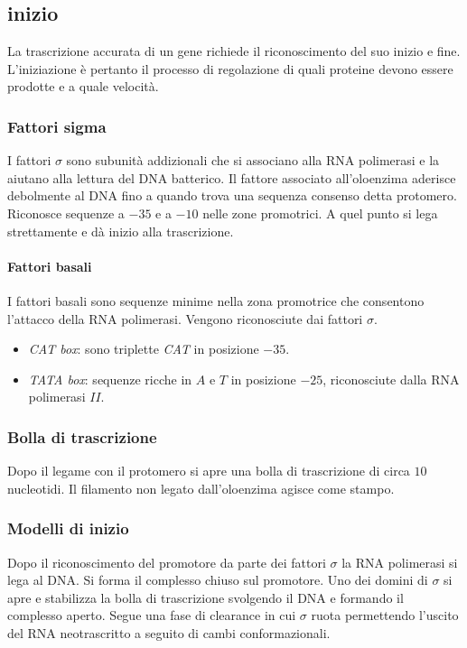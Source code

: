 	\subsection{inizio}
	La trascrizione accurata di un gene richiede il riconoscimento del suo inizio e fine.
	L'iniziazione \`e pertanto il processo di regolazione di quali proteine devono essere prodotte e a quale velocit\`a.

		\subsubsection{Fattori sigma}
		I fattori $\sigma$ sono subunit\`a addizionali che si associano alla RNA polimerasi e la aiutano alla lettura del DNA batterico.
		Il fattore associato all'oloenzima aderisce debolmente al DNA fino a quando trova una sequenza consenso detta protomero.
		Riconosce sequenze a $-35$ e a $-10$ nelle zone promotrici.
		A quel punto si lega strettamente e d\`a inizio alla trascrizione.
		
			\paragraph{Fattori basali}
			I fattori basali sono sequenze minime nella zona promotrice che consentono l'attacco della RNA polimerasi.
			Vengono riconosciute dai fattori $\sigma$.
			\begin{multicols}{2}
				\begin{itemize}
					\item \emph{CAT box}: sono triplette \emph{CAT} in posizione $-35$.
					\item \emph{TATA box}: sequenze ricche in $A$ e $T$ in posizione $-25$, riconosciute dalla RNA polimerasi $II$.
				\end{itemize}
			\end{multicols}



		\subsubsection{Bolla di trascrizione}
		Dopo il legame con il protomero si apre una bolla di trascrizione di circa $10$ nucleotidi.
		Il filamento non legato dall'oloenzima agisce come stampo.

		\subsubsection{Modelli di inizio}
		Dopo il riconoscimento del promotore da parte dei fattori $\sigma$ la RNA polimerasi si lega al DNA.
		Si forma il complesso chiuso sul promotore.
		Uno dei domini di $\sigma$ si apre e stabilizza la bolla di trascrizione svolgendo il DNA e formando il complesso aperto.
		Segue una fase di clearance in cui $\sigma$ ruota permettendo l'uscito del RNA neotrascritto a seguito di cambi conformazionali.

